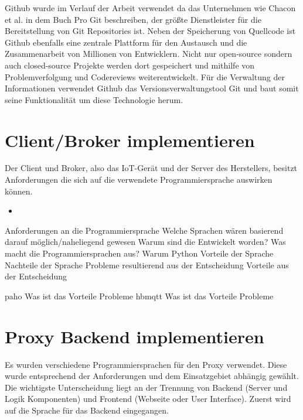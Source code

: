 Github wurde im Verlauf der Arbeit verwendet da das Unternehmen wie Chacon et al. in dem Buch Pro Git \cite{Chacon2014} beschreiben, der größte Dienstleister für die Bereitstellung von Git Repositories ist. Neben der Speicherung von Quellcode ist Github ebenfalls eine zentrale Plattform für den Austausch und die Zusammenarbeit von Millionen von Entwicklern. Nicht nur open-source sondern auch closed-source Projekte werden dort gespeichert und mithilfe von Problemverfolgung und Codereviews weiterentwickelt. Für die Verwaltung der Informationen verwendet Github das Versionsverwaltungstool Git und baut somit seine Funktionalität um diese Technologie herum.

\section{Client/Broker implementieren}

    Der Client und Broker, also das \ac{IoT}-Gerät und der Server des Herstellers, besitzt Anforderungen die sich auf die verwendete Programmiersprache auswirken können.
    \begin{itemize}
        \item 
    \end{itemize}
        Anforderungen an die Programmiersprache
        Welche Sprachen wären basierend darauf möglich/naheliegend gewesen
            Warum sind die Entwickelt worden? 
            Was macht die Programmiersprachen aus?
        Warum Python
            Vorteile der Sprache
            Nachteile der Sprache 
            Probleme resultierend aus der Entscheidung
            Vorteile aus der Entscheidung
    
    paho
        Was ist das
        Vorteile
        Probleme
    hbmqtt
        Was ist das
        Vorteile
        Probleme
            
\section{Proxy Backend implementieren}

    Es wurden verschiedene Programmiersprachen für den Proxy verwendet. Diese wurde entsprechend der Anforderungen und dem Einsatzgebiet abhängig gewählt.
    Die wichtigste Unterscheidung liegt an der Trennung von Backend (Server und Logik Komponenten) und Frontend (Webseite oder User Interface).
    Zuerst wird auf die Sprache für das Backend eingegangen.
    
